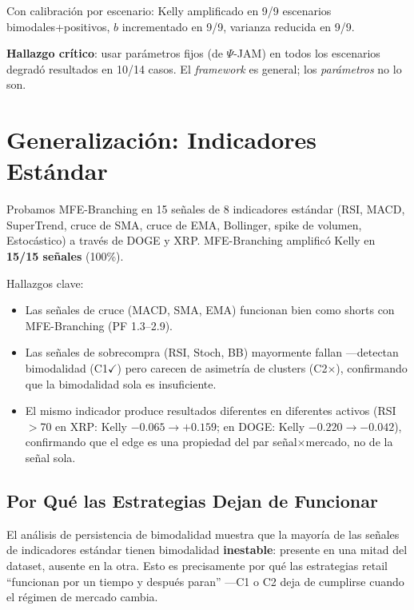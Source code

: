 \documentclass[11pt,a4paper]{article}
\begin{document}
Con calibración por escenario: Kelly amplificado en 9/9 escenarios bimodales+positivos, $b$ incrementado en 9/9, varianza reducida en 9/9.

\textbf{Hallazgo crítico}: usar parámetros fijos (de $\Psi$-JAM) en todos los escenarios degradó resultados en 10/14 casos. El \emph{framework} es general; los \emph{parámetros} no lo son.

\section{Generalización: Indicadores Estándar}

Probamos MFE-Branching en 15 señales de 8 indicadores estándar (RSI, MACD, SuperTrend, cruce de SMA, cruce de EMA, Bollinger, spike de volumen, Estocástico) a través de DOGE y XRP. MFE-Branching amplificó Kelly en \textbf{15/15 señales} (100\%).

Hallazgos clave:
\begin{itemize}
    \item Las señales de cruce (MACD, SMA, EMA) funcionan bien como shorts con MFE-Branching (PF 1.3--2.9).
    \item Las señales de sobrecompra (RSI, Stoch, BB) mayormente fallan ---detectan bimodalidad (C1$\checkmark$) pero carecen de asimetría de clusters (C2$\times$), confirmando que la bimodalidad sola es insuficiente.
    \item El mismo indicador produce resultados diferentes en diferentes activos (RSI$>$70 en XRP: Kelly $-0.065 \to +0.159$; en DOGE: Kelly $-0.220 \to -0.042$), confirmando que el edge es una propiedad del par señal$\times$mercado, no de la señal sola.
\end{itemize}

\subsection{Por Qué las Estrategias Dejan de Funcionar}

El análisis de persistencia de bimodalidad muestra que la mayoría de las señales de indicadores estándar tienen bimodalidad \textbf{inestable}: presente en una mitad del dataset, ausente en la otra. Esto es precisamente por qué las estrategias retail ``funcionan por un tiempo y después paran'' ---C1 o C2 deja de cumplirse cuando el régimen de mercado cambia.
\end{document}
